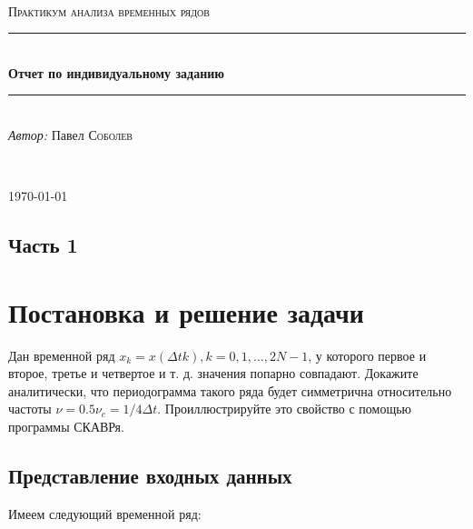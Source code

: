 \documentclass[12pt]{article}
\begin{document}
\begin{titlepage}

    \newcommand{\HRule}{\rule{\linewidth}{0.5mm}}
    
    \center

    \ \\[6cm]
    
    \textsc{\Large Практикум анализа временных рядов}\\[0.5cm]
    
    \HRule\\[0.4cm]
    
    {\huge\bfseries Отчет по индивидуальному заданию}\\[0.4cm]
    
    \HRule\\[0.5cm]
    
    \large
    \textit{Автор:} Павел \textsc{Соболев}
    
    \ \\[0.9cm]
    \vfill\vfill\vfill
    
    {\large\today}
    
    \vfill
    
\end{titlepage}

\subsection*{Часть 1}
\section*{Постановка и решение задачи}
\setcounter{section}{1}

\vspace{18pt}

Дан временной ряд $ x_k = x\left(\Delta t k\right), k = 0, 1, \ldots, 2N - 1 $, у которого первое и второе, третье и четвертое и т. д. значения попарно совпадают. Докажите аналитически, что периодограмма такого ряда будет симметрична относительно частоты $ \nu = 0.5 \nu_c = 1/4 \Delta t $. Проиллюстрируйте это свойство с помощью программы СКАВРя.

\subsection{Представление входных данных}

Имеем следующий временной ряд:
\end{document}
